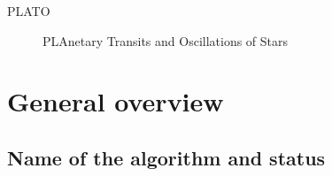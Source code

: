 \documentclass[a4paper, oneside, 11pt, article, english]{memoir}
\begin{document}
\begin{description}
  \firmlist
\item[PLATO] PLAnetary Transits and Oscillations of Stars
\end{description}


\clearpage
\chapter{General overview}
\label{chap:overview}

\section{Name of the algorithm and status}
\label{sec:name}

\end{document}
